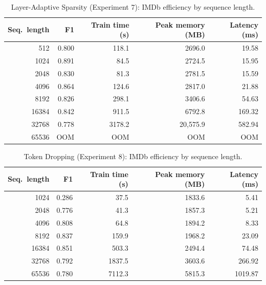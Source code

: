 \documentclass[11pt]{article}
\begin{document}
\begin{table}[ht]
  \centering
  \small
  \caption{Layer-Adaptive Sparsity (Experiment 7): IMDb efficiency by
  sequence length.}
  \label{tab:eff-layeradaptive}
  \begin{tabular}{@{}rrrrr@{}}
    \toprule
    Seq.\ length & F1 & Train time (s) & Peak memory (MB) & Latency (ms) \\
    \midrule
    512    & 0.800 & 118.1  & 2696.0   & 19.58 \\
    1024   & 0.891 & 84.5   & 2724.5   & 15.95 \\
    2048   & 0.830 & 81.3   & 2781.5   & 15.59 \\
    4096   & 0.864 & 124.6  & 2817.0   & 21.88 \\
    8192   & 0.826 & 298.1  & 3406.6   & 54.63 \\
    16384  & 0.842 & 911.5  & 6792.8   & 169.32 \\
    32768  & 0.778 & 3178.2 & 20{,}575.9 & 582.94 \\
    65536  & OOM   & OOM    & OOM      & OOM   \\
    \bottomrule
  \end{tabular}
\end{table}

\begin{table}[ht]
  \centering
  \small
  \caption{Token Dropping (Experiment 8): IMDb efficiency by sequence length.}
  \label{tab:eff-tokendrop}
  \begin{tabular}{@{}rrrrr@{}}
    \toprule
    Seq.\ length & F1 & Train time (s) & Peak memory (MB) & Latency (ms) \\
    \midrule
    1024   & 0.286 & 37.5   & 1833.6   & 5.41 \\
    2048   & 0.776 & 41.3   & 1857.3   & 5.21 \\
    4096   & 0.808 & 64.8   & 1894.2   & 8.33 \\
    8192   & 0.837 & 159.9  & 1968.2   & 23.09 \\
    16384  & 0.851 & 503.3  & 2494.4   & 74.48 \\
    32768  & 0.792 & 1837.5 & 3603.6   & 266.92 \\
    65536  & 0.780 & 7112.3 & 5815.3   & 1019.87 \\
    \bottomrule
  \end{tabular}
\end{table}
\end{document}
